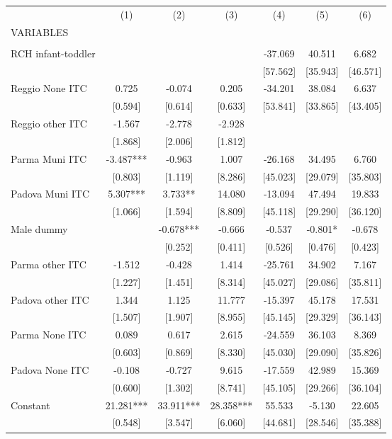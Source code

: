 \begin{tabular}{lcccccc} \hline
 & (1) & (2) & (3) & (4) & (5) & (6) \\
VARIABLES &  &  &  &  &  &  \\ \hline
 &  &  &  &  &  &  \\
RCH infant-toddler &  &  &  & -37.069 & 40.511 & 6.682 \\
 &  &  &  & [57.562] & [35.943] & [46.571] \\
Reggio None ITC & 0.725 & -0.074 & 0.205 & -34.201 & 38.084 & 6.637 \\
 & [0.594] & [0.614] & [0.633] & [53.841] & [33.865] & [43.405] \\
Reggio other ITC & -1.567 & -2.778 & -2.928 &  &  &  \\
 & [1.868] & [2.006] & [1.812] &  &  &  \\
Parma Muni ITC & -3.487*** & -0.963 & 1.007 & -26.168 & 34.495 & 6.760 \\
 & [0.803] & [1.119] & [8.286] & [45.023] & [29.079] & [35.803] \\
Padova Muni ITC & 5.307*** & 3.733** & 14.080 & -13.094 & 47.494 & 19.833 \\
 & [1.066] & [1.594] & [8.809] & [45.118] & [29.290] & [36.120] \\
Male dummy &  & -0.678*** & -0.666 & -0.537 & -0.801* & -0.678 \\
 &  & [0.252] & [0.411] & [0.526] & [0.476] & [0.423] \\
Parma other ITC & -1.512 & -0.428 & 1.414 & -25.761 & 34.902 & 7.167 \\
 & [1.227] & [1.451] & [8.314] & [45.027] & [29.086] & [35.811] \\
Padova other ITC & 1.344 & 1.125 & 11.777 & -15.397 & 45.178 & 17.531 \\
 & [1.507] & [1.907] & [8.955] & [45.145] & [29.329] & [36.143] \\
Parma None ITC & 0.089 & 0.617 & 2.615 & -24.559 & 36.103 & 8.369 \\
 & [0.603] & [0.869] & [8.330] & [45.030] & [29.090] & [35.826] \\
Padova None ITC & -0.108 & -0.727 & 9.615 & -17.559 & 42.989 & 15.369 \\
 & [0.600] & [1.302] & [8.741] & [45.105] & [29.266] & [36.104] \\
Constant & 21.281*** & 33.911*** & 28.358*** & 55.533 & -5.130 & 22.605 \\
 & [0.548] & [3.547] & [6.060] & [44.681] & [28.546] & [35.388] \\

\end{tabular}
